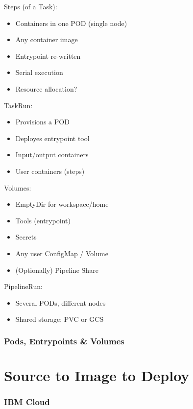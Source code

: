 \documentclass[aspectratio=169,11pt,hyperref={colorlinks=true}]{beamer}
\begin{document}
\begin{lblackrwhiteframe}
\begin{blackframe}
\begin{2columnsframe}
  {
  Steps (of a Task):
  \begin{itemize}
    \item Containers in one POD (single node)
    \item Any container image
    \item Entrypoint re-written
    \item Serial execution
    \item Resource allocation?
  \end{itemize}
  \vspace{3ex}
  TaskRun:
  \begin{itemize}
    \item Provisions a POD
    \item Deployes entrypoint tool
    \item Input/output containers
    \item User containers (steps)
  \end{itemize}
  }
  {
  Volumes:
  \begin{itemize}
    \item EmptyDir for workspace/home
    \item Tools (entrypoint)
    \item Secrets
    \item Any user ConfigMap / Volume
    \item (Optionally) Pipeline Share
  \end{itemize}
  \vspace{3ex}
  PipelineRun:
  \begin{itemize}
    \item Several PODs, different nodes
    \item Shared storage: PVC or GCS
  \end{itemize}
  }
  \frametitle{Pods, Entrypoints \& Volumes}
\end{2columnsframe}

\section{Source to Image to Deploy}

\begin{grayframe}
  \frametitle{IBM Cloud}
\end{grayframe}


\end{blackframe}
\end{lblackrwhiteframe}
\end{document}
